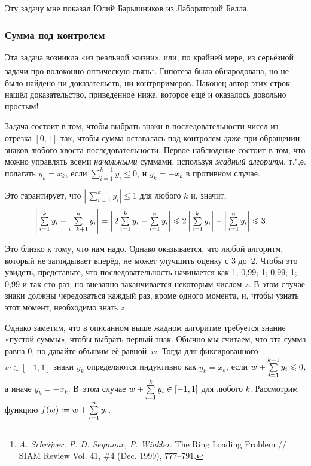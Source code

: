 \documentclass[twoside]{book}
\begin{document}
Эту задачу мне показал Юлий Барышников из Лабораторий Белла.

\subsubsection*{Сумма под контролем}

Эта задача возникла «из реальной жизни», или, по крайней мере, из серьёзной задачи про волоконно-оптическую связь\footnote{\emph{A. Schrijver, P. D. Seymour, P. Winkler}. The Ring Loading Problem /\!/ {SIAM Review} Vol. 41, \#4 (Dec. 1999), 777--791.}.
Гипотеза была обнародована, но не было найдено ни доказательств, ни контрпримеров.
Наконец автор этих строк нашёл доказательство, приведённое ниже, которое ещё и оказалось довольно простым!

\medskip

Задача состоит в том, чтобы выбрать знаки в последовательности чисел из отрезка $[0,1]$ так, чтобы сумма оставалась под контролем даже при обращении знаков любого хвоста последовательности.
Первое наблюдение состоит в том, что можно управлять всеми \emph{начальными} суммами, используя \emph{жадный алгоритм}, т.",е. полагать $y_k=x_k$, если $\sum\limits_{i=1}^{k-1}y_i \le 0$, и $y_k=-x_k$ в противном случае.

Это гарантирует, что $\left|\,\sum\limits_{i=1}^{k}y_i\right| \le 1$ для любого $k$ и, значит,
\begin{align*}
\left|\,\mathop{\textstyle\sum}\limits_{i=1}^{k}y_i-\mathop{\textstyle\sum}\limits_{i=k+1}^{n}y_i\right|&=\left|\,2\mathop{\textstyle\sum}\limits_{i=1}^{k}y_i-\mathop{\textstyle\sum}\limits_{i=1}^{n}y_i\right|
\leqslant2\left|\,\mathop{\textstyle\sum}\limits_{i=1}^{k}y_i\right|-\left|\,\mathop{\textstyle\sum}\limits_{i=1}^{n}y_i\right|\leqslant3.
\end{align*}

Это близко к тому, что нам надо. 
Однако оказывается, что любой алгоритм, который не заглядывает вперёд, не может улучшить оценку с 3 до~2.
Чтобы это увидеть, представьте, что последовательность начинается как
1; 0,99; 1; 0,99; 1; 0,99 и так сто раз, но внезапно заканчивается некоторым числом $z$.
В этом случае знаки должны чередоваться каждый раз, кроме одного момента, и, чтобы узнать этот момент, необходимо знать $z$.

Однако заметим, что в описанном выше жадном алгоритме требуется знание «пустой суммы», чтобы выбрать первый знак.
Обычно мы считаем, что эта сумма равна 0, но давайте объявим её равной~$w$.
Тогда для фиксированного $w\in [-1,1]$ знаки $y_k$ определяются индуктивно как $y_k=x_k$, если $w+\mathop{\textstyle\sum}\limits_{i=1}^{k-1}y_i \leqslant 0$, а иначе $y_k=-x_k$.
В~этом случае $w+\mathop{\textstyle\sum}\limits_{i=1}^{k}y_i \in[-1,1]$ для любого $k$.
Рассмотрим функцию $f(w) := w+\mathop{\textstyle\sum}\limits_{i=1}^ny_i$.
\end{document}
